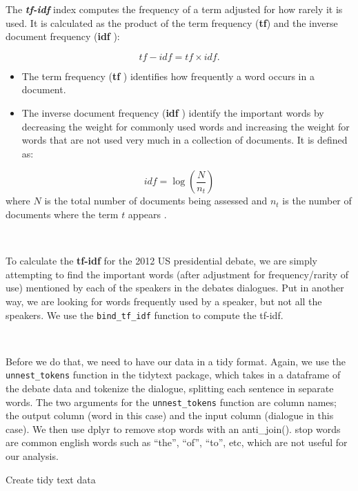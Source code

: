 \documentclass[
]{article}
\newenvironment{Shaded}{\begin{snugshade}}{\end{snugshade}}
\newcommand{\KeywordTok}[1]{\textcolor[rgb]{0.13,0.29,0.53}{\textbf{#1}}}
\newcommand{\NormalTok}[1]{#1}
\newcommand{\OperatorTok}[1]{\textcolor[rgb]{0.81,0.36,0.00}{\textbf{#1}}}
\newcommand{\StringTok}[1]{\textcolor[rgb]{0.31,0.60,0.02}{#1}}
\begin{document}
The \textbf{\emph{tf-idf}} index computes the frequency of a term
adjusted for how rarely it is used. It is calculated as the product of
the term frequency (\textbf{tf}) and the inverse document frequency
(\textbf{idf} ):

\[tf-idf = tf \times idf.\]

\begin{itemize}
\item
  The term frequency (\textbf{tf} ) identifies how frequently a word
  occurs in a document.
\item
  The inverse document frequency (\textbf{idf} ) identify the important
  words by decreasing the weight for commonly used words and increasing
  the weight for words that are not used very much in a collection of
  documents. It is defined as:
\end{itemize}

\[
idf = \log
(\frac{N}{n_t})\] where \(N\) is the total number of documents being
assessed and \(n_t\) is the number of documents where the term \(t\)
appears .

~

To calculate the \textbf{tf-idf} for the 2012 US presidential debate, we
are simply attempting to find the important words (after adjustment for
frequency/rarity of use) mentioned by each of the speakers in the
debates dialogues. Put in another way, we are looking for words
frequently used by a speaker, but not all the speakers. We use the
\texttt{bind\_tf\_idf} function to compute the tf-idf.

~

Before we do that, we need to have our data in a tidy format. Again, we
use the \texttt{unnest\_tokens} function in the tidytext package, which
takes in a dataframe of the debate data and tokenize the dialogue,
splitting each sentence in separate words. The two arguments for the
\texttt{unnest\_tokens} function are column names; the output column
(word in this case) and the input column (dialogue in this case). We
then use dplyr to remove stop words with an anti\_join(). stop words are
common english words such as ``the'', ``of'', ``to'', etc, which are not
useful for our analysis.

Create tidy text data

\begin{Shaded}
\end{Shaded}
\end{document}
